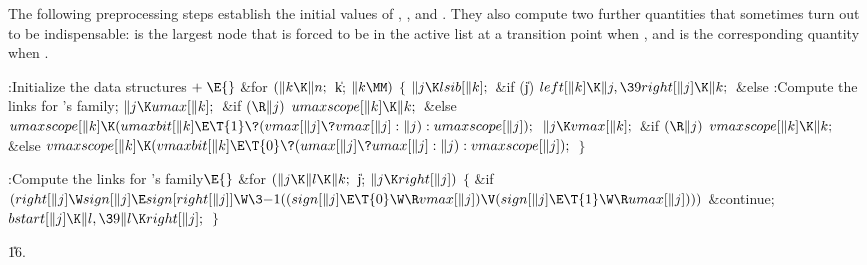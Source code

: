 The following preprocessing steps establish the initial values of ,
, and . They also compute two further quantities
that sometimes
turn out to be indispensable:  is the largest node that
is
forced to be in the active list at a transition point
when , and  is
the corresponding quantity when .

\Y\B\4:Initialize the data structures\X${}\mathrel+\E{}$\6
\&{for} ${}(\|k\K\|n;{}$ \|k; ${}\|k\MM){}$\5
${}\{{}$\1\6
${}\|j\K\\{lsib}[\|k];{}$\6
\&{if} (\|j)\1\5
${}\\{left}[\|k]\K\|j,\39\\{right}[\|j]\K\|k;{}$\2\6
\&{else}\1\5
:Compute the  links for 's family\X;\2\6
${}\|j\K\\{umax}[\|k];{}$\6
\&{if} ${}(\R\|j){}$\1\5
${}\\{umaxscope}[\|k]\K\|k;{}$\2\6
\&{else}\1\5
${}\\{umaxscope}[\|k]\K(\\{umaxbit}[\|k]\E\T{1}\?(\\{vmax}[\|j]\?\\{vmax}[\|j]:%
\|j):\\{umaxscope}[\|j]);{}$\2\6
${}\|j\K\\{vmax}[\|k];{}$\6
\&{if} ${}(\R\|j){}$\1\5
${}\\{vmaxscope}[\|k]\K\|k;{}$\2\6
\&{else}\1\5
${}\\{vmaxscope}[\|k]\K(\\{vmaxbit}[\|k]\E\T{0}\?(\\{umax}[\|j]\?\\{umax}[\|j]:%
\|j):\\{vmaxscope}[\|j]);{}$\2\6
\4${}\}{}$\2\par
\fi

\B{}:Compute the  links for 's family\X${}\E{}$\6
\&{for} ${}(\|j\K\|l\K\|k;{}$ \|j; ${}\|j\K\\{right}[\|j]){}$\5
${}\{{}$\1\6
\&{if} ${}(\\{right}[\|j]\W\\{sign}[\|j]\E\\{sign}[\\{right}[\|j]]\W\3{-1}((%
\\{sign}[\|j]\E\T{0}\W\R\\{vmax}[\|j])\V(\\{sign}[\|j]\E\T{1}\W\R\\{umax}[%
\|j]))){}$\1\5
\&{continue};\2\6
${}\\{bstart}[\|j]\K\|l,\39\|l\K\\{right}[\|j];{}$\6
\4${}\}{}$\2\par
\U16.\fi

